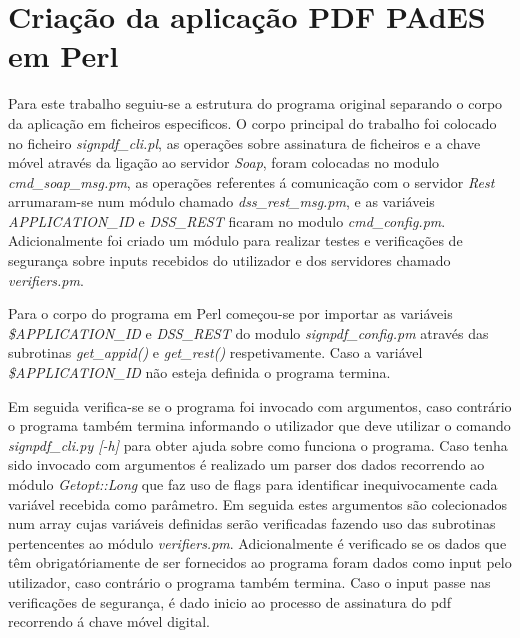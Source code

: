 \section{Criação da aplicação PDF PAdES em Perl}

Para este trabalho seguiu-se a estrutura do programa original separando o corpo da aplicação em ficheiros especificos. O corpo principal do trabalho foi colocado no ficheiro \textit{signpdf\_cli.pl}, as operações sobre assinatura de ficheiros e a chave móvel através da ligação ao servidor \textit{Soap}, foram colocadas no modulo \textit{cmd\_soap\_msg.pm}, as operações referentes á comunicação com o servidor \textit{Rest} arrumaram-se num módulo chamado \textit{dss\_rest\_msg.pm}, e as variáveis \textit{APPLICATION\_ID} e \textit{DSS\_REST} ficaram no modulo \textit{cmd\_config.pm}. Adicionalmente foi criado um módulo para realizar testes e verificações de segurança sobre inputs recebidos do utilizador e dos servidores chamado \textit{verifiers.pm}.\newline


Para o corpo do programa em Perl começou-se por importar as variáveis \textit{\$APPLICATION\_ID} e \textit{DSS\_REST} do modulo \textit{signpdf\_config.pm} através das \mbox{subrotinas} \textit{get\_appid()} e \textit{get\_rest()} respetivamente. Caso a variável \textit{\$APPLICATION\_ID} não esteja definida o programa termina.

\par Em seguida verifica-se se o programa foi invocado com argumentos, caso contrário o programa também termina informando o utilizador que deve utilizar o comando \textit{signpdf\_cli.py [-h]} para obter ajuda sobre como funciona o programa. Caso tenha sido invocado com argumentos é realizado um parser dos dados recorrendo ao módulo \textit{Getopt::Long} que faz uso de flags para identificar inequivocamente cada variável recebida como parâmetro. Em seguida estes argumentos são colecionados num array cujas variáveis definidas serão verificadas fazendo uso das subrotinas pertencentes ao módulo \textit{verifiers.pm}. Adicionalmente é verificado se os dados que têm obrigatóriamente de ser fornecidos ao programa foram dados como input pelo utilizador, caso contrário o programa também termina.\newline
Caso o input passe nas verificações de segurança, é dado inicio ao processo de assinatura do pdf recorrendo á chave móvel digital.\newline
